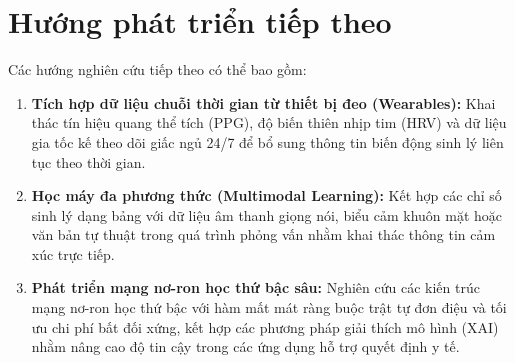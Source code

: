 \section{Hướng phát triển tiếp theo}
\label{sec:huong-phat-trien}

Các hướng nghiên cứu tiếp theo có thể bao gồm:
\begin{enumerate}
    \item \textbf{Tích hợp dữ liệu chuỗi thời gian từ thiết bị đeo (Wearables):} Khai thác tín hiệu quang thể tích (PPG), độ biến thiên nhịp tim (HRV) và dữ liệu gia tốc kế theo dõi giấc ngủ 24/7 để bổ sung thông tin biến động sinh lý liên tục theo thời gian.
    \item \textbf{Học máy đa phương thức (Multimodal Learning):} Kết hợp các chỉ số sinh lý dạng bảng với dữ liệu âm thanh giọng nói, biểu cảm khuôn mặt hoặc văn bản tự thuật trong quá trình phỏng vấn nhằm khai thác thông tin cảm xúc trực tiếp.
    \item \textbf{Phát triển mạng nơ-ron học thứ bậc sâu:} Nghiên cứu các kiến trúc mạng nơ-ron học thứ bậc với hàm mất mát ràng buộc trật tự đơn điệu và tối ưu chi phí bất đối xứng, kết hợp các phương pháp giải thích mô hình (XAI) nhằm nâng cao độ tin cậy trong các ứng dụng hỗ trợ quyết định y tế.
\end{enumerate}
